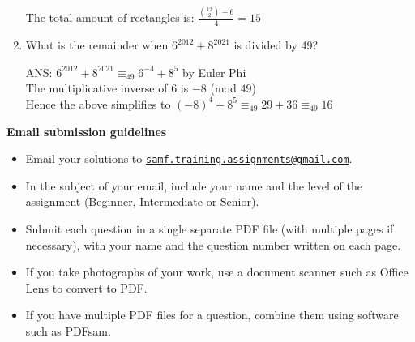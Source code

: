 \documentclass{article}
\begin{document}
\begin{enumerate}[1.]
The total amount of rectangles is:
$ \frac{{12\choose2} - 6}{4} = 15$

\vspace{6pt}
\item %
What is the remainder when $6^{2012} + 8^{2021}$ is divided by 49?
\medskip
\item[ANS:]
$6^{2012} + 8^{2021} \equiv_{49} 6^{-4} + 8^{5}$ by Euler Phi\\
The multiplicative inverse of $6$ is $-8$ (mod $49$)\\
Hence the above simplifies to $(-8)^{4} + 8^{5}\equiv_{49} 29+36 \equiv_{49} 16$


\end{enumerate}

\vspace{8pt}
\textbf{\Large Email submission guidelines}
\begin{itemize}
	\item Email your solutions to \href{mailto:samf.training.assignments@gmail.com}{\texttt{samf.training.assignments@gmail.com}}.
	\item In the subject of your email, include your name and the level of the assignment (Beginner, Intermediate or Senior).
	\item Submit each question in a single separate PDF file (with multiple pages if necessary), with your name and the question number written on each page.
	\item If you take photographs of your work, use a document scanner such as Office Lens to convert to PDF.
	\item If you have multiple PDF files for a question, combine them using software such as PDFsam.
\end{itemize}
\end{document}
